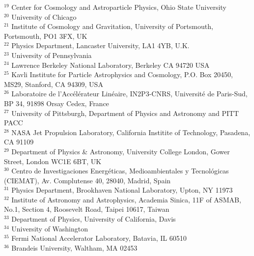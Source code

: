 {{$^{19}$ Center for Cosmology and Astroparticle Physics, Ohio State University\\
$^{20}$ University of Chicago\\
$^{21}$ Institute of Cosmology and Gravitation, University of Portsmouth, Portsmouth, PO1 3FX, UK\\
$^{22}$ Physics Department, Lancaster University, LA1 4YB, U.K.\\
$^{23}$ University of Pennsylvania\\
$^{24}$ Lawrence Berkeley National Laboratory, Berkeley CA 94720 USA\\
$^{25}$ Kavli Institute for Particle Astrophysics and Cosmology, P.O. Box 20450, MS29, Stanford, CA 94309, USA\\
$^{26}$ Laboratoire de l'Acc\'{e}l\'{e}rateur Lin\'{e}aire, IN2P3-CNRS, Universit\'{e} de Paris-Sud, BP 34, 91898 Orsay Cedex, France\\
$^{27}$ University of Pittsburgh, Department of Physics and Astronomy and PITT PACC\\
$^{28}$ NASA Jet Propulsion Laboratory, California Institite of Technology, Pasadena, CA 91109\\
$^{29}$ Department of Physics & Astronomy, University College London, Gower Street, London WC1E 6BT, UK\\
$^{30}$ Centro de Investigaciones Energ\'{e}ticas, Medioambientales y Tecnol\'{o}gicas (CIEMAT), Av. Complutense 40, 28040, Madrid, Spain\\
$^{31}$ Physics Department, Brookhaven National Laboratory,  Upton, NY 11973\\
$^{32}$ Institute of Astronomy and Astrophysics, Academia Sinica, 11F of ASMAB, No.1, Section 4, Roosevelt Road, Taipei 10617, Taiwan\\
$^{33}$ Department of Physics, University of California, Davis\\
$^{34}$ University of Washington\\
$^{35}$ Fermi National Accelerator Laboratory, Batavia, IL 60510\\
$^{36}$ Brandeis University, Waltham, MA 02453
}
}
